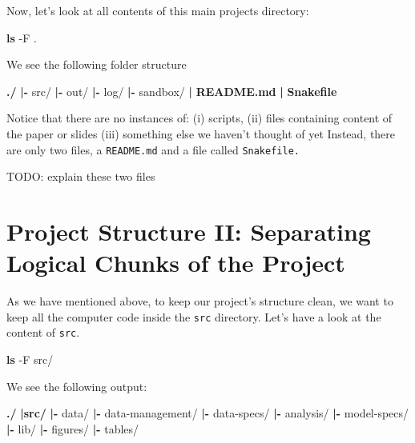 \documentclass[]{book}
\newenvironment{Shaded}{\begin{snugshade}}{\end{snugshade}}
\newcommand{\KeywordTok}[1]{\textcolor[rgb]{0.13,0.29,0.53}{\textbf{{#1}}}}
\newcommand{\NormalTok}[1]{{#1}}
\theoremstyle{definition}
\theoremstyle{definition}
\theoremstyle{definition}
\theoremstyle{remark}
\begin{document}
Now, let's look at all contents of this main projects directory:

\begin{Shaded}
\begin{Highlighting}[]
\KeywordTok{ls} \NormalTok{-F .}
\end{Highlighting}
\end{Shaded}

We see the following folder structure

\begin{Shaded}
\begin{Highlighting}[]
\KeywordTok{./}
    \KeywordTok{|-} \NormalTok{src/}
    \KeywordTok{|-} \NormalTok{out/}
    \KeywordTok{|-} \NormalTok{log/}
    \KeywordTok{|-} \NormalTok{sandbox/}
    \KeywordTok{|} \KeywordTok{README.md}
    \KeywordTok{|} \KeywordTok{Snakefile}
\end{Highlighting}
\end{Shaded}

Notice that there are no instances of: (i) scripts, (ii) files
containing content of the paper or slides (iii) something else we
haven't thought of yet Instead, there are only two files, a
\texttt{README.md} and a file called \texttt{Snakefile.}

TODO: explain these two files

\section{Project Structure II: Separating Logical Chunks of the
Project}\label{project-structure-ii-separating-logical-chunks-of-the-project}

As we have mentioned above, to keep our project's structure clean, we
want to keep all the computer code inside the \texttt{src} directory.
Let's have a look at the content of \texttt{src}.

\begin{Shaded}
\begin{Highlighting}[]
\KeywordTok{ls} \NormalTok{-F src/}
\end{Highlighting}
\end{Shaded}

We see the following output:

\begin{Shaded}
\begin{Highlighting}[]
\KeywordTok{./}
    \KeywordTok{|src/}
        \KeywordTok{|-} \NormalTok{data/}
        \KeywordTok{|-} \NormalTok{data-management/}
        \KeywordTok{|-} \NormalTok{data-specs/}
        \KeywordTok{|-} \NormalTok{analysis/}
        \KeywordTok{|-} \NormalTok{model-specs/}
        \KeywordTok{|-} \NormalTok{lib/}
        \KeywordTok{|-} \NormalTok{figures/}
        \KeywordTok{|-} \NormalTok{tables/}
\end{Highlighting}
\end{Shaded}
\end{document}
